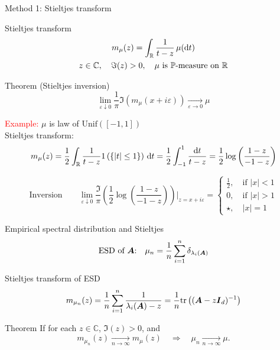 \documentclass[10pt]{beamer}
\begin{document}
\begin{frame}{Method 1: Stieltjes transform}
\begin{exampleblock}{Stieltjes transform} 
\begin{equation*} \begin{gathered}
m_{\mu}(z) = \int_{\mathbb{R}} \frac{1}{t-z} \, \mu(\dif t)\\
z \in \mathbb{C}, \quad \Im(z) > 0, \quad \text{$\mu$ is $\mathbb{P}$-measure on $\mathbb{R}$} 
\end{gathered}
\end{equation*}
\end{exampleblock}

\begin{alertblock}{Theorem (Stieltjes inversion)}
    \[\lim_{\varepsilon \downarrow 0} \frac{1}{\pi} \Im \left ( m_{\mu}(x + i \varepsilon) \right ) \xrightarrow[\varepsilon \to 0]{} \mu \] 
\end{alertblock}

\pause 

{ \footnotesize \textcolor{red}{Example:} $\mu$ is law of $\text{Unif}([-1,1])$\\
Stieltjes transform:
    \[ m_{\mu}(z) = \frac{1}{2} \int_{\mathbb{R}} \frac{1}{t-z} 1 \left (\{|t| \le 1\} \right ) \, \dif t = \frac{1}{2} \int_{-1}^1 \frac{\dif t}{t-z}  = \frac{1}{2} \log \left ( \frac{1-z}{-1 -z} \right ) \]

\[ \text{Inversion} \qquad \lim_{\varepsilon \downarrow 0} \frac{\Im}{\pi} \left (\frac{1}{2} \log \left (\frac{1-z}{-1-z} \right ) \right ) \big |_{z = x + i\varepsilon} = \begin{cases} \frac{1}{2}, \quad \text{if $|x| < 1$}\\
0, \quad \text{if $|x| > 1$}\\
\star, \quad \text{$|x| = 1$}
\end{cases}\] }
\end{frame}

\begin{frame}{Empirical spectral distribution and Stieltjes}
\[\text{ESD of $\AA$:} \quad \mu_n = \frac{1}{n} \sum_{i=1}^n \delta_{\lambda_i(\AA)}\]

\begin{exampleblock}{Stieltjes transform of ESD}
\[ m_{\mu_n}(z) = \frac{1}{n} \sum_{i=1}^n \frac{1}{\lambda_i(\AA)-z} = \frac{1}{n} \text{tr} \left ( (\AA-z \Id_d)^{-1} \right )  \]
\end{exampleblock} 

\begin{alertblock}{Theorem} If for each $z \in \mathbb{C}$, $\Im(z) > 0$, and 
\[ m_{\mu_n}(z) \xrightarrow[n \to \infty]{} m_{\mu}(z) \quad \Rightarrow \quad \mu_n \xrightarrow[n \to \infty]{} \mu.\]
\end{alertblock}
\end{frame}
\end{document}
